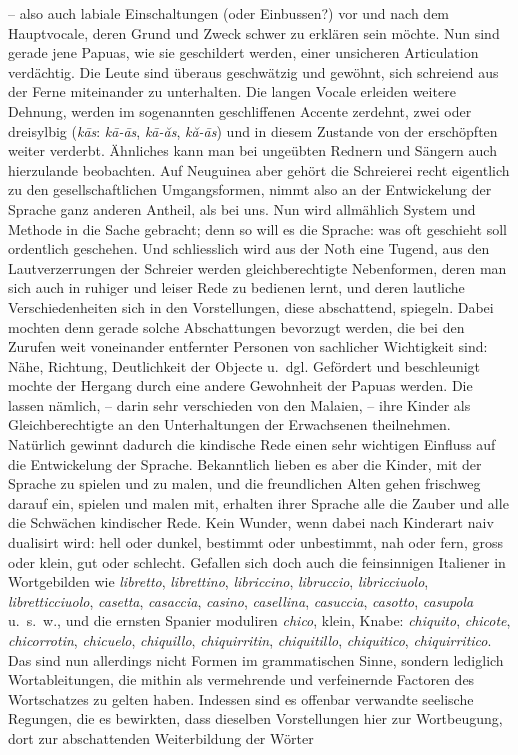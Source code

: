 \noindent – also auch labiale Einschaltungen (oder Einbussen?) vor und nach dem Hauptvocale, deren Grund und Zweck schwer zu erklären sein möchte. Nun sind gerade jene Papuas, wie sie geschildert werden, einer unsicheren Articulation verdächtig. Die Leute sind überaus geschwätzig und gewöhnt, sich schreiend aus der Ferne miteinander zu unterhalten. Die langen Vocale erleiden weitere Dehnung, werden im sogenannten geschliffenen Accente zerdehnt, zwei oder dreisylbig (\textit{kās}: \textit{kā-ās}, \textit{kā-ăs}, \textit{kă-ās}) und in diesem Zustande von der erschöpften  weiter verderbt. Ähnliches kann man bei ungeübten Rednern und Sängern auch hierzulande beobachten. Auf Neuguinea aber gehört die Schreierei recht \label{fp.424} eigentlich zu den gesellschaftlichen Umgangsformen, nimmt also an der \label{sp.445} Entwickelung der Sprache ganz anderen Antheil, als bei uns. Nun wird allmählich System und Methode in die Sache gebracht; denn so will es die Sprache: was oft geschieht soll ordentlich geschehen. Und schliesslich wird aus der Noth eine Tugend, aus den Lautverzerrungen der Schreier werden gleichberechtigte Nebenformen, deren man sich auch in ruhiger und leiser Rede zu bedienen lernt, und deren lautliche Verschiedenheiten sich in den Vorstellungen, diese abschattend, spiegeln. Dabei mochten denn gerade solche Abschattungen bevorzugt werden, die bei den Zurufen weit voneinander entfernter Personen von sachlicher Wichtigkeit sind: Nähe, Richtung, Deutlichkeit der Objecte u.~dgl. Gefördert und beschleunigt mochte der Hergang durch eine andere Gewohnheit der Papuas werden. Die lassen nämlich, – darin sehr verschieden von den Malaien, – ihre Kinder als Gleichberechtigte an den Unterhaltungen der Erwachsenen theilnehmen. Natürlich gewinnt dadurch die kindische Rede einen sehr wichtigen Einfluss auf die Entwickelung der Sprache. Bekanntlich lieben es aber die Kinder, mit der Sprache zu spielen und zu malen, und die freundlichen Alten gehen frischweg darauf ein, spielen und malen mit, erhalten ihrer Sprache alle die Zauber und alle die Schwächen kindischer Rede. Kein Wunder, wenn dabei nach Kinderart naiv dualisirt wird: hell oder dunkel, bestimmt oder unbestimmt, nah oder fern, gross oder klein, gut oder schlecht. Gefallen sich doch auch die feinsinnigen Italiener in Wortgebilden wie \textit{libretto}, \textit{librettino}, \textit{libriccino}, \textit{libruccio}, \textit{libricciuolo}, \textit{libretticciuolo}, \textit{casetta}, \textit{casaccia}, \textit{casino}, \textit{casellina}, \textit{casuccia}, \textit{casotto}, \textit{casupola} u.~s.~w., und die ernsten Spanier moduliren \textit{chico}, klein, Knabe: \textit{chiquito}, \textit{chicote}, \textit{chicorrotin}, \textit{chicuelo}, \textit{chiquillo}, \textit{chiquirritin}, \textit{chiquitillo}, \textit{chiquitico}, \textit{chiquirritico}. Das sind nun allerdings nicht Formen im grammatischen Sinne, sondern lediglich Wortableitungen, die mithin als vermehrende und verfeinernde Factoren des Wortschatzes zu gelten haben. Indessen sind es offenbar verwandte seelische Regungen, die es bewirkten, dass dieselben Vorstellungen hier zur Wortbeugung, dort zur abschattenden Weiterbildung der Wörter 
